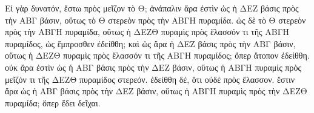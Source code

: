 \begin{Parallel}{}{}
{{\greekfont Εἰ γὰρ δυνατόν, ἔστω πρὸς μεῖζον τὸ Θ; ἀνάπαλιν ἄρα ἐστὶν ὡς ἡ ΔΕΖ βάσις
πρὸς τὴν ΑΒΓ βάσιν, οὕτως τὸ Θ στερεὸν πρὸς τὴν ΑΒΓΗ πυραμίδα. ὡς δὲ τὸ
Θ στερεὸν πρὸς τὴν ΑΒΓΗ πυραμίδα, οὕτως ἡ ΔΕΖΘ πυραμὶς πρὸς ἔλασσόν τι τῆς
ΑΒΓΗ πυραμίδος, ὡς ἔμπροσθεν ἐδείθθη; καὶ ὡς ἄρα ἡ ΔΕΖ βάσις πρὸς τὴν
ΑΒΓ βάσιν, οὕτως ἡ ΔΕΖΘ πυραμὶς πρὸς ἔλασσόν τι τῆς ΑΒΓΗ πυραμίδος; ὅπερ
ἄτοπον ἐδείθθη. οὐκ ἄρα ἐστὶν ὡς ἡ ΑΒΓ βάσις πρὸς τὴν ΔΕΖ βάσιν, οὕτως
ἡ ΑΒΓΗ πυραμὶς πρὸς μεῖζόν τι τῆς ΔΕΖΘ πυραμίδος στερεόν. ἐδείθθη δέ, ὅτι
οὐδὲ πρὸς ἔλασσον. ἔστιν ἄρα ὡς ἡ ΑΒΓ βάσις πρὸς τὴν ΔΕΖ βάσιν,
οὕτως ἡ ΑΒΓΗ πυραμὶς πρὸς τὴν ΔΕΖΘ πυραμίδα; ὅπερ ἔδει δεῖχαι.}}

\end{Parallel}
